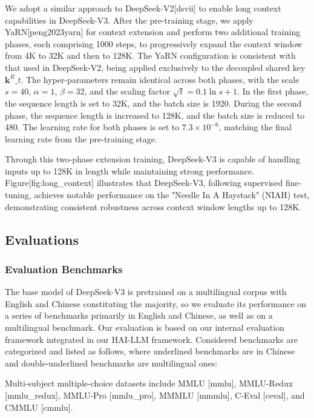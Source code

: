 \documentclass[11pt,a4paper]{article}
\begin{document}
We adopt a similar approach to DeepSeek-V2[dsvii] to enable long context capabilities in DeepSeek-V3. 
After the pre-training stage, we apply YaRN[peng2023yarn] for context extension and perform two additional training phases, each comprising 1000 steps, to progressively expand the context window from 4K to 32K and then to 128K.
The YaRN configuration is consistent with that used in DeepSeek-V2, being applied exclusively to the decoupled shared key $\mathbf{k}^R\_t$.
The hyper-parameters remain identical across both phases, with the scale $s = 40$, $\alpha = 1$, $\beta = 32$, and the scaling factor $\sqrt{t} = 0.1 \ln{s} + 1$.
In the first phase, the sequence length is set to 32K, and the batch size is 1920. 
During the second phase, the sequence length is increased to 128K, and the batch size is reduced to 480. 
The learning rate for both phases is set to $7.3 \times 10^{-6}$, matching the final learning rate from the pre-training stage.

Through this two-phase extension training, DeepSeek-V3 is capable of handling inputs up to 128K in length while maintaining strong performance. 
Figure[fig:long\_context] illustrates that DeepSeek-V3, following supervised fine-tuning, achieves notable performance on the "Needle In A Haystack" (NIAH) test, demonstrating consistent robustness across context window lengths up to 128K.

\subsection{Evaluations}

\subsubsection{Evaluation Benchmarks}

The base model of DeepSeek-V3 is pretrained on a multilingual corpus with English and Chinese constituting the majority, so we evaluate its performance on a series of benchmarks primarily in English and Chinese, as well as on a multilingual benchmark.
Our evaluation is based on our internal evaluation framework integrated in our HAI-LLM framework. 
Considered benchmarks are categorized and listed as follows, where underlined benchmarks are in Chinese and double-underlined benchmarks are multilingual ones:

Multi-subject multiple-choice datasets include MMLU [mmlu], MMLU-Redux [mmlu\_redux], MMLU-Pro [mmlu\_pro], MMMLU [mmmlu], C-Eval [ceval], and CMMLU [cmmlu].
\end{document}
